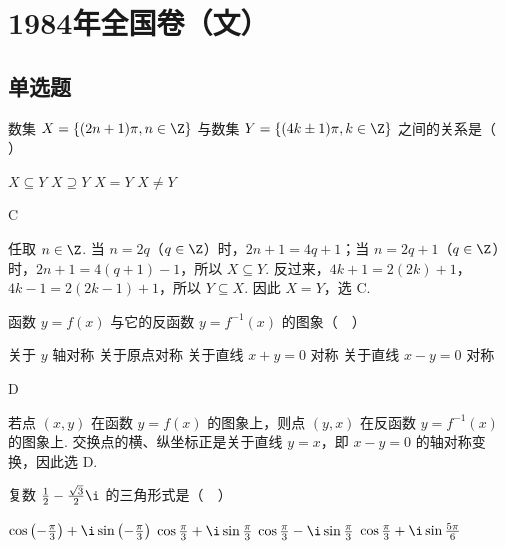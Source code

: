 \chapter{1984年全国卷（文）}

\section{单选题}

\begin{problem}

数集 \(X = \{(2n + 1)\pi, n\in\Z\}\) 与数集 \(Y = \{(4k \pm 1)\pi, k\in\Z\}\) 之间的关系是（\(\quad\)）

\choices
    {\(X \subseteq Y\)}
    {\(X \supseteq Y\)}
    {\(X = Y\)}
    {\(X \neq Y\)}
\end{problem}

\begin{answer}
C
\end{answer}

\begin{solution}
任取 \(n\in\Z\). 当 \(n=2q\)（\(q\in\Z\)）时，\(2n+1=4q+1\)；当 \(n=2q+1\)（\(q\in\Z\)）时，\(2n+1=4(q+1)-1\)，所以 \(X\subseteq Y\). 反过来，\(4k+1=2(2k)+1\)，\(4k-1=2(2k-1)+1\)，所以 \(Y\subseteq X\). 因此 \(X=Y\)，选 C.
\end{solution}

\begin{problem}

函数 \(y = f(x)\) 与它的反函数 \(y = f^{-1}(x)\) 的图象（\(\quad\)）

\choices
    {关于 \(y\) 轴对称}
    {关于原点对称}
    {关于直线 \(x + y = 0\) 对称}
    {关于直线 \(x - y = 0\) 对称}
\end{problem}

\begin{answer}
D
\end{answer}

\begin{solution}
若点 \((x,y)\) 在函数 \(y=f(x)\) 的图象上，则点 \((y,x)\) 在反函数 \(y=f^{-1}(x)\) 的图象上. 交换点的横、纵坐标正是关于直线 \(y=x\)，即 \(x-y=0\) 的轴对称变换，因此选 D.
\end{solution}

\begin{problem}

复数 \(\frac{1}{2} - \frac{\sqrt{3}}{2}\i\) 的三角形式是（\(\quad\)）

\choices
    {\(\cos \left(-\frac{\pi}{3}\right) + \i\sin \left(-\frac{\pi}{3}\right)\)}
    {\(\cos \frac{\pi}{3} + \i\sin \frac{\pi}{3}\)}
    {\(\cos \frac{\pi}{3} - \i\sin \frac{\pi}{3}\)}
    {\(\cos \frac{\pi}{3} + \i\sin \frac{5\pi}{6}\)}
\end{problem}

